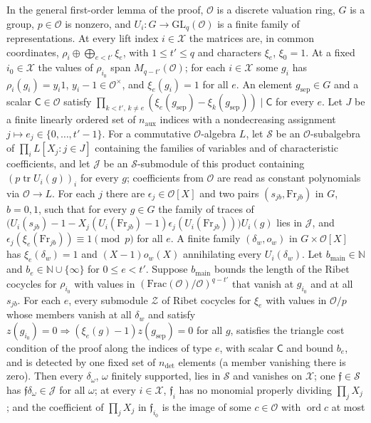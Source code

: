 \documentclass[reqno]{amsart}
\theoremstyle{definition}
\theoremstyle{plain}
\newcommand{\Oc}{\mathcal{O}}
\newcommand{\ord}{\operatorname{ord}}
\newcommand{\tr}{\operatorname{tr}}
\newcommand{\GL}{\mathrm{GL}}
\begin{document}
In the general first-order lemma of the proof, \(\Oc\) is a discrete valuation ring, \(G\) is a group, \(p \in \Oc\) is nonzero, and \(U_i \colon G \to \GL_q(\Oc)\) is a finite family of representations.  At every lift index \(i \in \mathcal X\) the matrices are, in common coordinates, \(\rho_i \oplus \bigoplus_{e < t'}\xi_e\), with \(1 \le t' \le q\) and characters \(\xi_e\), \(\xi_0 = 1\).  At a fixed \(i_0 \in \mathcal X\) the values of \(\rho_{i_0}\) span \(M_{q-t'}(\Oc)\); for each \(i \in \mathcal X\) some \(g_i\) has \(\rho_i(g_i) = y_i 1\), \(y_i - 1 \in \Oc^\times\), and \(\xi_e(g_i) = 1\) for all \(e\).  An element \(g_{\mathrm{sep}} \in G\) and a scalar \(\mathsf C \in \Oc\) satisfy \(\prod_{k < t',\, k \ne e}(\xi_e(g_{\mathrm{sep}}) - \xi_k(g_{\mathrm{sep}})) \mid \mathsf C\) for every \(e\).  Let \(J\) be a finite linearly ordered set of \(n_{\mathrm{aux}}\) indices with a nondecreasing assignment \(j \mapsto e_j \in \{0, \dots, t'-1\}\).  For a commutative \(\Oc\)-algebra \(L\), let \(\mathcal S\) be an \(\Oc\)-subalgebra of \(\prod_i L[X_j : j \in J]\) containing the families of variables and of characteristic coefficients, and let \(\mathcal J\) be an \(\mathcal S\)-submodule of this product containing \((p\tr U_i(g))_i\) for every \(g\); coefficients from \(\Oc\) are read as constant polynomials via \(\Oc \to L\).  For each \(j\) there are \(\epsilon_j \in \Oc[X]\) and two pairs \((s_{jb}, \mathrm{Fr}_{jb})\) in \(G\), \(b = 0, 1\), such that for every \(g \in G\) the family of traces of \(\bigl(U_i(s_{jb}) - 1 - X_j(U_i(\mathrm{Fr}_{jb}) - 1)\epsilon_j(U_i(\mathrm{Fr}_{jb}))\bigr)U_i(g)\) lies in \(\mathcal J\), and \(\epsilon_j(\xi_e(\mathrm{Fr}_{jb})) \equiv 1 \pmod p\) for all \(e\).  A finite family \((\delta_w, o_w)\) in \(G \times \Oc[X]\) has \(\xi_e(\delta_w) = 1\) and \((X - 1)o_w(X)\) annihilating every \(U_i(\delta_w)\).  Let \(b_{\mathrm{main}} \in \mathbb N\) and \(b_e \in \mathbb N \cup \{\infty\}\) for \(0 \le e < t'\).  Suppose \(b_{\mathrm{main}}\) bounds the length of the Ribet cocycles for \(\rho_{i_0}\) with values in \((\mathrm{Frac}(\Oc)/\Oc)^{q-t'}\) that vanish at \(g_{i_0}\) and at all \(s_{jb}\).  For each \(e\), every submodule \(\mathcal Z\) of Ribet cocycles for \(\xi_e\) with values in \(\Oc/p\) whose members vanish at all \(\delta_w\) and satisfy \(z(g_{i_0}) = 0 \Rightarrow (\xi_e(g) - 1)z(g_{\mathrm{sep}}) = 0\) for all \(g\), satisfies the triangle cost condition of the proof along the indices of type \(e\), with scalar \(\mathsf C\) and bound \(b_e\), and is detected by one fixed set of \(n_{\mathrm{det}}\) elements (a member vanishing there is zero).  Then every \(\delta_\omega\), \(\omega\) finitely supported, lies in \(\mathcal S\) and vanishes on \(\mathcal X\); one \(\mathfrak f \in \mathcal S\) has \(\mathfrak f\delta_\omega \in \mathcal J\) for all \(\omega\); at every \(i \in \mathcal X\), \(\mathfrak f_i\) has no monomial properly dividing \(\prod_j X_j\); and the coefficient of \(\prod_j X_j\) in \(\mathfrak f_{i_0}\) is the image of some \(c \in \Oc\) with \(\ord c\) at most
\end{document}
